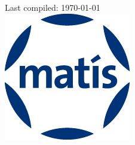 \begin{titlepage}


{\large Last compiled: \today}\\[3cm] %

\centering
\includegraphics[scale=0.5]{graphics/logos/logo_matis.png}\\[1cm] %
 

\vfill %

\end{titlepage}

\restoregeometry
